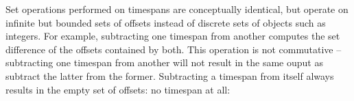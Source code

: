 \noindent Set operations performed on timespans are conceptually identical, but
operate on infinite but bounded sets of offsets instead of discrete sets of
objects such as integers. For example, subtracting one timespan from another
computes the set difference of the offsets contained by both. This operation is
not commutative -- subtracting one timespan from another will not result in the
same ouput as subtract the latter from the former. Subtracting a timespan from
itself always results in the empty set of offsets: no timespan at all:

\begin{comment}
<abjad>
result = timespantools.Timespan(0, 10) - timespantools.Timespan(0, 10)
print(format(result))
result = timespantools.Timespan(0, 10) - timespantools.Timespan(5, 15)
print(format(result))
result = timespantools.Timespan(0, 10) - timespantools.Timespan(10, 20)
print(format(result))
result = timespantools.Timespan(5, 15) - timespantools.Timespan(0, 10)
print(format(result))
result = timespantools.Timespan(5, 15) - timespantools.Timespan(5, 15)
print(format(result))
result = timespantools.Timespan(5, 15) - timespantools.Timespan(10, 20)
print(format(result))
result = timespantools.Timespan(10, 20) - timespantools.Timespan(0, 10)
print(format(result))
result = timespantools.Timespan(10, 20) - timespantools.Timespan(5, 15)
print(format(result))
result = timespantools.Timespan(10, 20) - timespantools.Timespan(10, 20)
print(format(result))
</abjad>
\end{comment}


